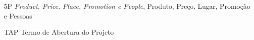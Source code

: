 \begin{siglas}
	\item[5P] \emph{Product, Price, Place, Promotion e People}, Produto, Preço, Lugar, Promoção e Pessoas
	\item[TAP] Termo de Abertura do Projeto

\end{siglas}
